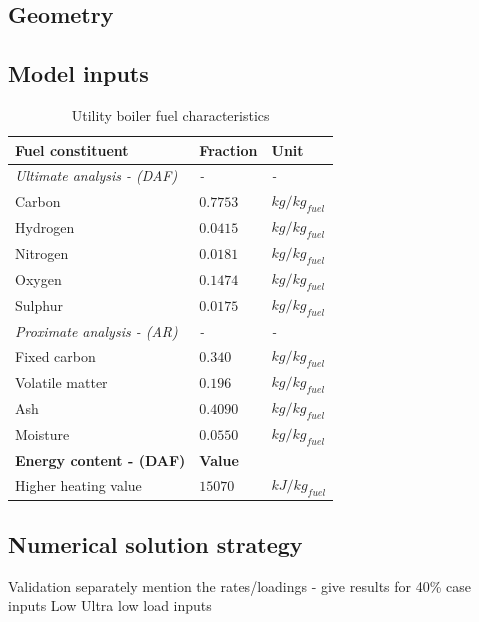 \documentclass[review]{elsarticle}
\begin{document}
\subsection{Geometry} 

\subsection{Model inputs}

\begin{table}[h!]
\centering
\caption{Utility boiler fuel characteristics}
\vspace{5mm}
\label{fuel}
{\tabulinesep=1.2mm
\begin{tabularx}{\textwidth}{p{} p{} l}
\hline
\textbf{Fuel constituent} & \textbf{Fraction} & \textbf{Unit}\\
\hline
\textit{Ultimate analysis - (DAF)} & \textit{-} & \textit{-}\\
Carbon & $0.7753$ & $kg/kg_{fuel}$\\
Hydrogen & $0.0415$ & $kg/kg_{fuel}$\\
Nitrogen & $0.0181$ & $kg/kg_{fuel}$\\
Oxygen & $0.1474$ & $kg/kg_{fuel}$\\
Sulphur & $0.0175$ & $kg/kg_{fuel}$\\
\textit{Proximate analysis - (AR)} & \textit{-} & \textit{-}\\
Fixed carbon & $0.340$ & $kg/kg_{fuel}$\\
Volatile matter & $0.196$ & $kg/kg_{fuel}$\\
Ash & $0.4090$ & $kg/kg_{fuel}$\\
Moisture & $0.0550$ & $kg/kg_{fuel}$\\
\hline
\textbf{Energy content - (DAF)} & \textbf{Value} &\\
\hline
Higher heating value & $15070$ & $kJ/kg_{fuel}$\\
\hline
\end{tabularx}}
\end{table}



\subsection{Numerical solution strategy} 





Validation separately mention the rates/loadings - give results for 40\% case inputs
Low Ultra low load inputs
\end{document}
